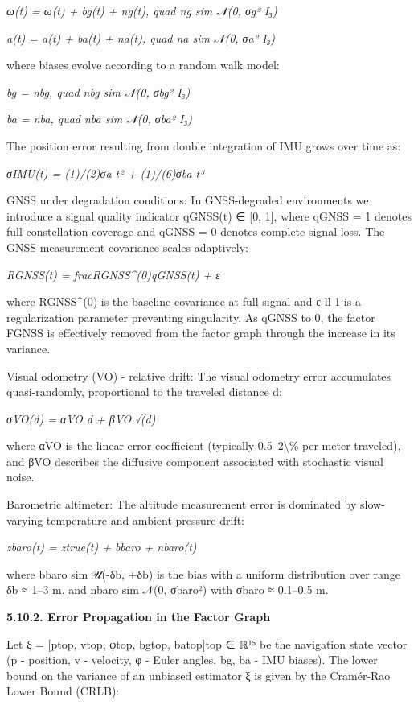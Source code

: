 \documentclass[
]{article}
\begin{document}
\emph{ω(t) = ω(t) + bg(t) + ng(t), quad ng sim 𝒩(0, σg² I₃)}

\emph{a(t) = a(t) + ba(t) + na(t), quad na sim 𝒩(0, σa² I₃)}

where biases evolve according to a random walk model:

\emph{bg = nbg, quad nbg sim 𝒩(0, σbg² I₃)}

\emph{ba = nba, quad nba sim 𝒩(0, σba² I₃)}

The position error resulting from double integration of IMU grows over
time as:

\emph{σIMU(t) = (1)/(2)σa t² + (1)/(6)σba t³}

GNSS under degradation conditions: In GNSS-degraded environments we
introduce a signal quality indicator qGNSS(t) ∈ {[}0, 1{]}, where qGNSS
= 1 denotes full constellation coverage and qGNSS = 0 denotes complete
signal loss. The GNSS measurement covariance scales adaptively:

\emph{RGNSS(t) = fracRGNSS\^{}(0)qGNSS(t) + ε}

where RGNSS\^{}(0) is the baseline covariance at full signal and ε ll 1
is a regularization parameter preventing singularity. As qGNSS to 0, the
factor FGNSS is effectively removed from the factor graph through the
increase in its variance.

Visual odometry (VO) - relative drift: The visual odometry error
accumulates quasi-randomly, proportional to the traveled distance d:

\emph{σVO(d) = αVO d + βVO √(d)}

where αVO is the linear error coefficient (typically
0.5--2\textbackslash\% per meter traveled), and βVO describes the
diffusive component associated with stochastic visual noise.

Barometric altimeter: The altitude measurement error is dominated by
slow-varying temperature and ambient pressure drift:

\emph{zbaro(t) = ztrue(t) + bbaro + nbaro(t)}

where bbaro sim 𝒰(-δb, +δb) is the bias with a uniform distribution over
range δb ≈ 1--3 m, and nbaro sim 𝒩(0, σbaro²) with σbaro ≈ 0.1--0.5 m.

\textbf{5.10.2. Error Propagation in the Factor Graph}

Let ξ = {[}ptop, vtop, φtop, bgtop, batop{]}top ∈ ℝ¹⁵ be the navigation
state vector (p - position, v - velocity, φ - Euler angles, bg, ba - IMU
biases). The lower bound on the variance of an unbiased estimator ξ is
given by the Cramér-Rao Lower Bound (CRLB):
\end{document}
